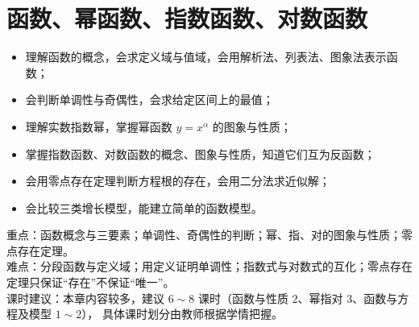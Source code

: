 \chapter{函数、幂函数、指数函数、对数函数}

\begin{objective}
\begin{itemize}
  \item 理解函数的概念，会求定义域与值域，会用解析法、列表法、图象法表示函数；
  \item 会判断单调性与奇偶性，会求给定区间上的最值；
  \item 理解实数指数幂，掌握幂函数 $y=x^{\alpha}$ 的图象与性质；
  \item 掌握指数函数、对数函数的概念、图象与性质，知道它们互为反函数；
  \item 会用零点存在定理判断方程根的存在，会用二分法求近似解；
  \item 会比较三类增长模型，能建立简单的函数模型。
\end{itemize}
\end{objective}

\begin{keypoint}
重点：函数概念与三要素；单调性、奇偶性的判断；幂、指、对的图象与性质；零点存在定理。\\
难点：分段函数与定义域；用定义证明单调性；指数式与对数式的互化；零点存在定理只保证“存在”不保证“唯一”。\\
课时建议：本章内容较多，建议 $6\sim8$ 课时（函数与性质 $2$、幂指对 $3$、函数与方程及模型 $1\sim2$），
具体课时划分由教师根据学情把握。
\end{keypoint}


